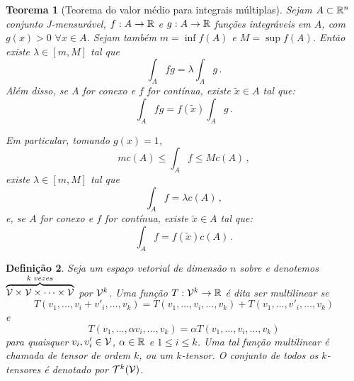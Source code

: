 \documentclass[a4paper,12pt]{extreport}
\newtheorem{mydef}{Definição}
\newtheorem{myteo}[mydef]{Teorema}
\newif\ifspacesbetweentheos
\newcommand{\theonewpage}{
\ifspacesbetweentheos
  \newpage
\fi
}
\begin{document}
\begin{myteo}[Teorema do valor médio para integrais múltiplas]
  Sejam $A \subset \mathbb{R}^n$ conjunto J-mensurável,
  $f:A \to \mathbb{R}$
  e
  $g:A \to \mathbb{R}$
  funções integráveis em $A$,
  com $g(x) > 0 \,\, \forall x \in A$.
  Sejam também $m = \inf f(A)$
  e $M = \sup f(A)$.
  Então existe $\lambda \in [m, M]$ tal que
  \begin{equation}
    \int_A fg = \lambda \int_A g\,.
  \end{equation}
  Além disso,
  se $A$ for conexo e $f$ for contínua,
  existe $\tilde x \in A$ tal que:
  \begin{equation}
    \int_A fg = f(\tilde x) \int_Ag\,.
  \end{equation}

  Em particular, tomando $g(x) = 1$,
  \begin{equation}
    mc(A) \le \int_A f \le Mc(A)\,,
  \end{equation}
  existe $\lambda \in [m, M]$ tal que
  \begin{equation}
    \int_A f = \lambda c(A)\,,
  \end{equation}
  e, se $A$ for conexo e $f$ for contínua,
  existe $\tilde x \in A$ tal que:
  \begin{equation}
    \int_A f = f(\tilde x) c(A)\,.
  \end{equation}
  
\end{myteo}


\theonewpage


\begin{mydef}
  Seja \Vcal{} um espaço vetorial de dimensão $n$ sobre \realnumb{}
  e denotemos
  $\overbrace{\mathcal{V} \times \mathcal{V} \times \dots \times \mathcal{V}}^{k\,\,vezes}$
  por $\mathcal{V}^k$.
  Uma função $T:\mathcal{V}^k \to \mathbb{R}$ é dita ser \emph{multilinear} se
  \begin{equation}
    T(v_1, \dots, v_i + v'_i, \dots, v_k) =
    T(v_1, \dots, v_i, \dots, v_k)
    + T(v_1, \dots, v'_i, \dots, v_k)
  \end{equation}
  e
  \begin{equation}
    T(v_1, \dots,\alpha v_i, \dots, v_k) =
    \alpha T(v_1, \dots, v_i, \dots, v_k)
  \end{equation}
  para quaisquer $v_i, v'_i \in \mathcal{V}$,
  $\alpha \in \mathbb{R}$ e $1 \le i \le k$.
  Uma tal função multilinear é chamada de \emph{tensor} de ordem $k$,
  ou um \emph{$k$-tensor}.
  O conjunto de todos os $k$-tensores é denotado por $\mathcal{T}^k(\mathcal{V})$.
\end{mydef}
\end{document}
